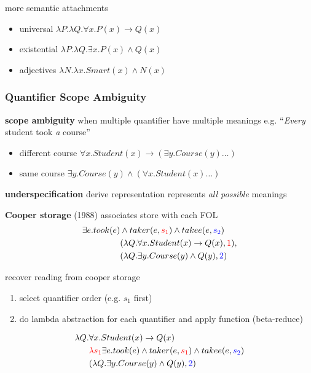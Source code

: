 \documentclass[]{article}
\theoremstyle{definition}
\begin{document}
more semantic attachments
\begin{itemize}
    \item universal $\lambda P. \lambda Q. \forall x. P(x) \to Q(x)$
    \item existential $\lambda P. \lambda Q. \exists x. P(x) \wedge Q(x)$
    \item adjectives $ \lambda N.\lambda x. Smart(x) \wedge N(x)$
\end{itemize}

\subsubsection{Quantifier Scope Ambiguity}%
\label{ssub:quantifier_scope_ambiguity}

\textbf{scope ambiguity} when multiple quantifier have multiple meanings e.g. ``\textit{Every} student took \textit{a} course''
\begin{itemize}
    \item different course $\forall x.Student(x) \to (\exists y.Course(y) \ldots)$
    \item same course $\exists y.Course(y) \wedge (\forall x.Student(x) \ldots)$
\end{itemize}

\textbf{underspecification} derive representation represents \textit{all possible} meanings

\textbf{Cooper storage} (1988) associates store with each FOL
\begin{align*}
    \exists e.took(e) &\wedge taker(e, \color{red} s_1 \color{black} ) \wedge takee(e,\color{blue}{s_2} \color{black}) \\
                      &(\lambda Q. \forall x.Student(x) \to Q(x), \color{red} 1 \color{black}), \\
                      &(\lambda Q. \exists y.Course(y) \wedge Q(y), \color{blue} 2 \color{black})
\end{align*}

recover reading from cooper storage
\begin{enumerate}
    \item select quantifier order (e.g. $s_1$ first)
    \item do lambda abstraction for each quantifier and apply function (beta-reduce)
\end{enumerate}

\begin{align*}
    \lambda Q. &\forall x.Student(x) \to Q(x) \\
               & \color{red} \lambda s_1 \color{black} \exists e.took(e) \wedge taker(e, \color{red} s_1 \color{black} ) \wedge takee(e,\color{blue}{s_2} \color{black}) \\
                      &(\lambda Q. \exists y.Course(y) \wedge Q(y), \color{blue} 2 \color{black})
\end{align*}
\end{document}
